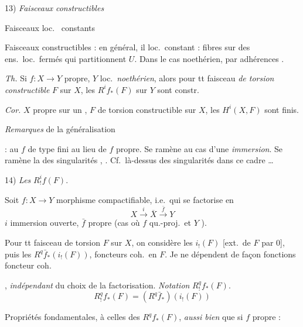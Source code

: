 \documentclass[11pt,a4paper]{article}
\begin{document}

13) \emph{Faisceaux constructibles}

Faisceaux loc.\ \struck{\ill{}} constants

Faisceaux constructibles : en général, il 
loc.\ constant : fibres  
sur des ens.\ loc.\ fermés qui partitionnent $U$. Dans le cas noethérien,
 par adhérences \ill{} \struck{\ill{}}.

\emph{Th.} Si $f : X \to Y$ propre, $Y$ loc.\ \emph{noethérien}, alors pour tt
faisceau \emph{de torsion} \emph{constructible} $F$ sur $X$, les
$R^i f_{*}(F)$ sur $Y$ sont constr.

\emph{Cor.} $X$ propre sur un , \ill{} $F$ de
torsion constructible sur $X$, les $H^i(X, F)$ sont finis.

\emph{Remarques}  de la généralisation

: au $f$ de type fini au lieu de $f$ propre. Se ramène au cas d'une
\emph{immersion}. Se ramène  la  des
singularités  ,
 \ill{}. Cf.\ là-dessus  \ill{}
  \ill{} des singularités \struck{\ill{}}
dans ce cadre …

14) \emph{Les} $R^i_{!} f(F)$.

Soit $f : X \to Y$ morphisme compactifiable, i.e.\ qui se factorise en
\[
  X \xrightarrow{\;i\;} \overline{X} \xrightarrow{\;\bar{f}\;} Y
\]
$i$ immersion ouverte, $\bar{f}$ propre (cas où $f$ qu.-proj.\ et $Y$
).

Pour tt faisceau de torsion $F$ sur $X$, on considère les $i_{!}(F)$ [ext.\ de
$F$ par $0$], puis les $R^q \bar{f}_{*}(i_{!}(F))$, foncteurs coh.\ en $F$.
Je   ne dépendent \ill{} de façon
\ill{} \ill{} \ill{} fonctions 
\ill{} \ill{} \ill{} foncteur coh.

 \ill{} , \ill{} \emph{indépendant} du choix de
la factorisation.
\emph{Notation} $R^q_{!} f_{*}(F)$.
\[
  R^q_{!} f_{*}(F) = (R^q \bar{f}_{*})(i_{!}(F))
\]

 Propriétés fondamentales,  à celles
des $R^q f_{*}(F)$, \emph{aussi bien} que si $f$ propre :
\end{document}

